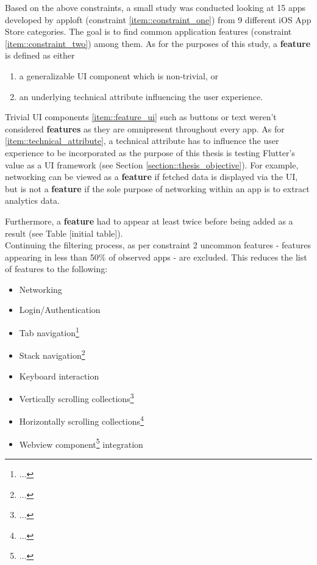 Based on the above constraints, a small study was conducted looking at 15 apps developed by apploft (constraint \ref{item::constraint_one}) from 9 different iOS App Store categories. 
The goal is to find common application features (constraint \ref{item::constraint_two}) among them.
As for the purposes of this study, a \textbf{feature} is defined as either 
\begin{enumerate}[label=(\alph*)]
    \item a generalizable UI component which is non-trivial, or \label{item::feature_ui}
    \item an underlying technical attribute influencing the user experience. \label{item::technical_attribute}
\end{enumerate}

Trivial UI components \ref{item::feature_ui} such as buttons or text weren't considered \textbf{features} as they are omnipresent throughout every app.
As for \ref{item::technical_attribute}, a technical attribute has to influence the user experience to be incorporated as the purpose of this thesis is testing Flutter's value as a UI framework (see Section \ref{section::thesis_objective}).
For example, networking can be viewed as a \textbf{feature} if fetched data is displayed via the UI, but is not a \textbf{feature} if the sole purpose of networking within 
an app is to extract analytics data.

Furthermore, a \textbf{feature} had to appear at least twice before being added as a result (see
Table [initial table]).\\
Continuing the filtering process, as per constraint 2 uncommon features - features appearing
in less than 50\% of observed apps - are excluded. This reduces the list of features to the following:

\begin{itemize}
    \item Networking
    \item Login/Authentication
    \item Tab navigation\footnote{...}
    \item Stack navigation\footnote{...}
    \item Keyboard interaction
    \item Vertically scrolling collections\footnote{...}
    \item Horizontally scrolling collections\footnote{...}
    \item Webview component\footnote{...} integration
\end{itemize}

